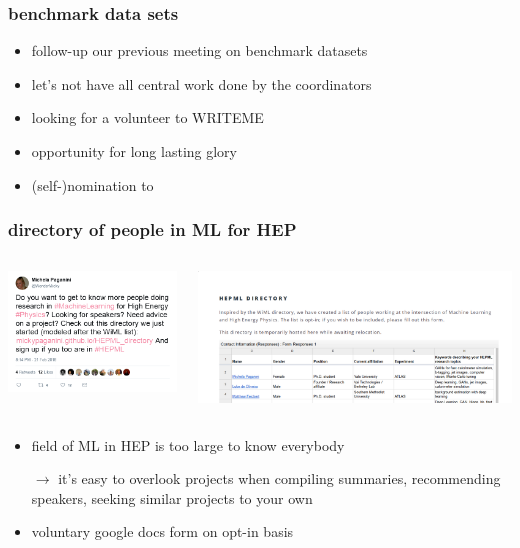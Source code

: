 \begin{frame}
  \frametitle{benchmark data sets}
  \begin{itemize}
    \item follow-up our previous meeting on benchmark datasets
    \item let's not have all central work done by the coordinators
    \item looking for a volunteer to WRITEME
    \item opportunity for long lasting glory
    \item (self-)nomination to 
  \end{itemize}
\end{frame}

\begin{frame}
  \frametitle{directory of people in ML for HEP}
  \begin{columns}
    \begin{column}{.3\textwidth}
      \includegraphics[width=.9\textwidth]{./tweet.png}
    \end{column}
    \begin{column}{.7\textwidth}
      \includegraphics[width=\textwidth]{./directory.png}
    \end{column}
  \end{columns}
  \begin{itemize}
    \item field of ML in HEP is too large to know everybody
    \item[$\rightarrow$] it's easy to overlook projects when compiling summaries, recommending speakers, seeking similar projects to your own
    \item voluntary google docs form on opt-in basis
  \end{itemize}
\end{frame}

